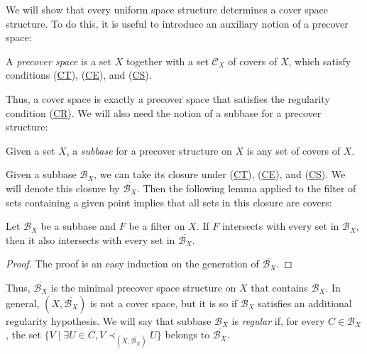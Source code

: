 \documentclass[reqno]{amsart}
\newcommand{\axref}[1]{(\hyperref[ax:#1]{#1})}
\theoremstyle{definition}
\theoremstyle{remark}
\numberwithin{figure}{section}
\newcommand{\rb}{\prec}
\begin{document}
We will show that every uniform space structure determines a cover space structure.
To do this, it is useful to introduce an auxiliary notion of a precover space:

\begin{defn}
A \emph{precover space} is a set $X$ together with a set $\mathcal{C}_X$ of covers of $X$, which satisfy conditions \axref{CT}, \axref{CE}, and \axref{CS}.
\end{defn}

Thus, a cover space is exactly a precover space that satisfies the regularity condition \axref{CR}.
We will also need the notion of a subbase for a precover structure:

\begin{defn}
Given a set $X$, a \emph{subbase} for a precover structure on $X$ is any set of covers of $X$.
\end{defn}

Given a subbase $\mathcal{B}_X$, we can take its closure under \axref{CT}, \axref{CE}, and \axref{CS}.
We will denote this closure by $\overline{\mathcal{B}_X}$.
Then the following lemma applied to the filter of sets containing a given point implies that all sets in this closure are covers:

\begin{lem}
Let $\mathcal{B}_X$ be a subbase and $F$ be a filter on $X$.
If $F$ intersects with every set in $\mathcal{B}_X$, then it also intersects with every set in $\overline{\mathcal{B}_X}$.
\end{lem}
\begin{proof}
The proof is an easy induction on the generation of $\overline{\mathcal{B}_X}$.
\end{proof}

Thus, $\overline{\mathcal{B}_X}$ is the minimal precover space structure on $X$ that contains $\mathcal{B}_X$.
In general, $(X,\overline{\mathcal{B}_X})$ is not a cover space, but it is so if $\mathcal{B}_X$ satisfies an additional regularity hypothesis.
We will say that subbase $\mathcal{B}_X$ is \emph{regular} if, for every $C \in \mathcal{B}_X$, the set $\{ V \mid \exists U \in C, V \rb_{(X,\overline{\mathcal{B}_X})} U \}$ belongs to $\overline{\mathcal{B}_X}$.
\end{document}
